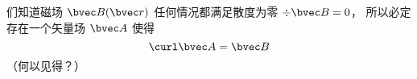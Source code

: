 
们知道磁场 $\bvec B(\bvec r)$ 任何情况都满足散度为零 $\div \bvec B = 0$， 所以必定存在一个矢量场 $\bvec A$ 使得
\begin{equation}
\curl \bvec A = \bvec B
\end{equation}
（何以见得？）

